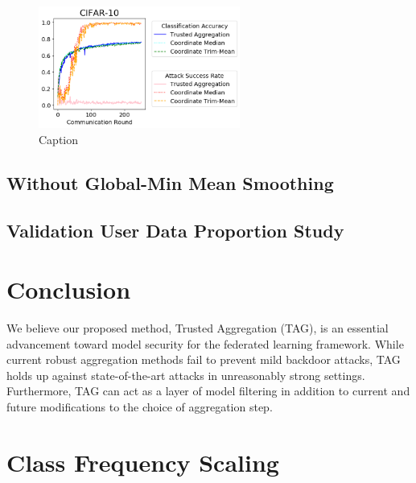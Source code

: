 \documentclass{article} %
\begin{document}
\begin{figure}[htp]
    \centering
    \includegraphics[height=4cm, width=.5\textwidth]{make_article/make_visuals/visuals/accuracy--cifar_10--n_malicious2--dba1--beta0.2--alpha1.png}
    \caption{Caption}
    \label{fig:my_label}
\end{figure}


%
\subsection{Without Global-Min Mean Smoothing}



%
\subsection{Validation User Data Proportion Study}


% 
\section{Conclusion}

We believe our proposed method, Trusted Aggregation (TAG), is an essential advancement toward model security for the federated learning framework. While current robust aggregation methods fail to prevent mild backdoor attacks, TAG holds up against state-of-the-art attacks in unreasonably strong settings. Furthermore, TAG can act as a layer of model filtering in addition to current and future modifications to the choice of aggregation step.

\newpage
{  \small 


}


%
\pagebreak
\appendix

%
\section{Class Frequency Scaling}
\end{document}
